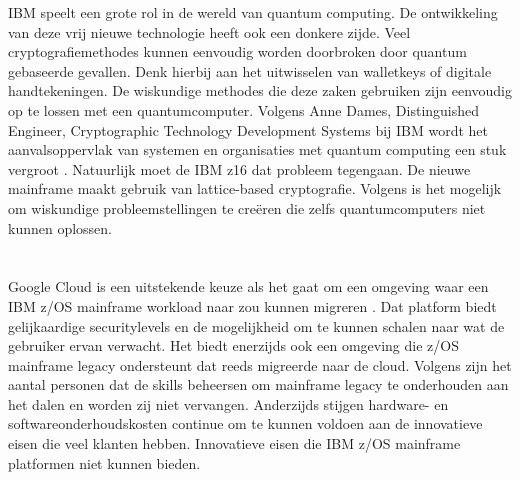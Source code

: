 IBM speelt een grote rol in de wereld van quantum computing. De ontwikkeling van deze vrij nieuwe technologie heeft ook een donkere zijde. Veel cryptografiemethodes kunnen eenvoudig worden doorbroken door quantum gebaseerde gevallen. Denk hierbij aan het uitwisselen van walletkeys of digitale handtekeningen. De wiskundige methodes die deze zaken gebruiken zijn eenvoudig op te lossen met een quantumcomputer. Volgens Anne Dames, Distinguished Engineer, Cryptographic Technology Development Systems bij IBM wordt het aanvalsoppervlak van systemen en organisaties met quantum computing een stuk vergroot \autocite{Almekinders2022}. Natuurlijk moet de IBM z16 dat probleem tegengaan. De nieuwe mainframe maakt gebruik van lattice-based cryptografie. Volgens \textcite{Almekinders2022} is het mogelijk om wiskundige probleemstellingen te creëren die zelfs quantumcomputers niet kunnen oplossen. 

\section{}
\label{sec:IBM Mainframe modernisatie}


\subsection{}
\label{sec:Workloads migreren naar de cloud}


Google Cloud is een uitstekende keuze als het gaat om een omgeving waar een IBM z/OS mainframe workload naar zou kunnen migreren \autocite{Astadia2021}. Dat platform biedt gelijkaardige securitylevels en de mogelijkheid om te kunnen schalen naar wat de gebruiker ervan verwacht. Het biedt enerzijds ook een omgeving die z/OS mainframe legacy ondersteunt dat reeds migreerde naar de cloud. Volgens \textcite{Astadia2021} zijn het aantal personen dat de skills beheersen om mainframe legacy te onderhouden aan het dalen en worden zij niet vervangen. Anderzijds stijgen hardware- en softwareonderhoudskosten continue om te kunnen voldoen aan de innovatieve eisen die veel klanten hebben. Innovatieve eisen die IBM z/OS mainframe platformen niet kunnen bieden. 

\subsection{}
\label{sec:Wat is Astadia?}

